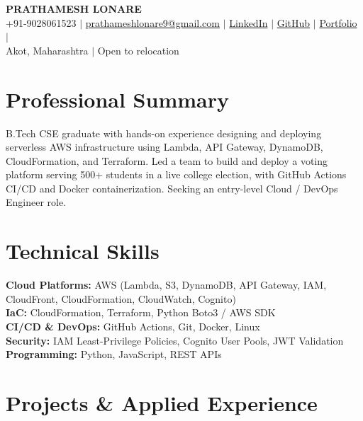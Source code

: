 \documentclass[a4paper,10pt]{article}
\date{}
\begin{document}
\begin{center}
{\large\textbf{PRATHAMESH LONARE}} \\
+91-9028061523 $|$ \href{mailto:prathameshlonare9@gmail.com}{prathameshlonare9@gmail.com} $|$
\href{https://www.linkedin.com/in/prathamesh-lonare21/}{LinkedIn} $|$
\href{https://github.com/prathameshlonare/}{GitHub} $|$
\href{https://prathameshlonare.me/}{Portfolio} $|$ \\
Akot, Maharashtra $|$ Open to relocation
\end{center}

\section*{Professional Summary}
B.Tech CSE graduate with hands-on experience designing and deploying
serverless AWS infrastructure using Lambda, API Gateway, DynamoDB,
CloudFormation, and Terraform. Led a team to build and deploy a
voting platform serving 500+ students in a live college election,
with GitHub Actions CI/CD and Docker containerization. Seeking an
entry-level Cloud / DevOps Engineer role.

\section*{Technical Skills}
\textbf{Cloud Platforms:} AWS (Lambda, S3, DynamoDB, API Gateway, IAM, CloudFront, CloudFormation, CloudWatch, Cognito) \\
\textbf{IaC:} CloudFormation, Terraform, Python Boto3 / AWS SDK \\
\textbf{CI/CD \& DevOps:} GitHub Actions, Git, Docker, Linux \\
\textbf{Security:} IAM Least-Privilege Policies, Cognito User Pools, JWT Validation \\
\textbf{Programming:} Python, JavaScript, REST APIs

\section*{Projects \& Applied Experience}
\end{document}
